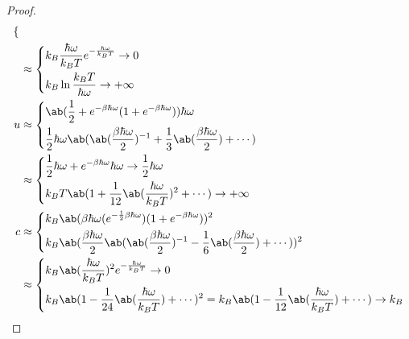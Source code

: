 \documentclass[a4paper,11pt]{jlreq}
\begin{document}
\begin{proof}
\begin{align}
\begin{dcases}
                \end{dcases}                                                  \\
      & \approx \begin{dcases}
                  k_B\frac{\hbar\omega}{k_BT}e^{- \frac{\hbar\omega}{k_BT}} \to 0 \\
                  k_B\ln\frac{k_BT}{\hbar\omega} \to +\infty                      \\
                \end{dcases}                                                                                    \\
    u & \approx \begin{dcases}
                  \ab(\frac{1}{2} + e^{-\beta\hbar\omega}(1 + e^{-\beta\hbar\omega}))\hbar\omega                                        \\
                  \frac{1}{2}\hbar\omega\ab(\ab(\frac{\beta\hbar\omega}{2})^{-1} + \frac{1}{3}\ab(\frac{\beta\hbar\omega}{2}) + \cdots) \\
                \end{dcases}                              \\
      & \approx \begin{dcases}
                  \frac{1}{2}\hbar\omega + e^{-\beta\hbar\omega}\hbar\omega \to \frac{1}{2}\hbar\omega \\
                  k_BT\ab(1 + \frac{1}{12}\ab(\frac{\hbar\omega}{k_BT})^{2} + \cdots) \to +\infty      \\
                \end{dcases}                                                              \\
    c & \approx \begin{dcases}
                  k_B\ab(\beta\hbar\omega(e^{-\frac{1}{2}\beta\hbar\omega})(1 + e^{-\beta\hbar\omega}))^2                                             \\
                  k_B\ab(\frac{\beta\hbar\omega}{2}\ab(\ab(\frac{\beta\hbar\omega}{2})^{-1} - \frac{1}{6}\ab(\frac{\beta\hbar\omega}{2}) + \cdots))^2 \\
                \end{dcases}                                                            \\
      & \approx \begin{dcases}
                  k_B\ab(\frac{\hbar\omega}{k_BT})^2e^{-\frac{\hbar\omega}{k_BT}} \to 0 \\
                  k_B\ab(1 - \frac{1}{24}\ab(\frac{\hbar\omega}{k_BT}) + \cdots)^2 = k_B\ab(1 - \frac{1}{12}\ab(\frac{\hbar\omega}{k_BT}) + \cdots) \to k_B
                \end{dcases}
  \end{align}
\end{proof}
\end{document}
